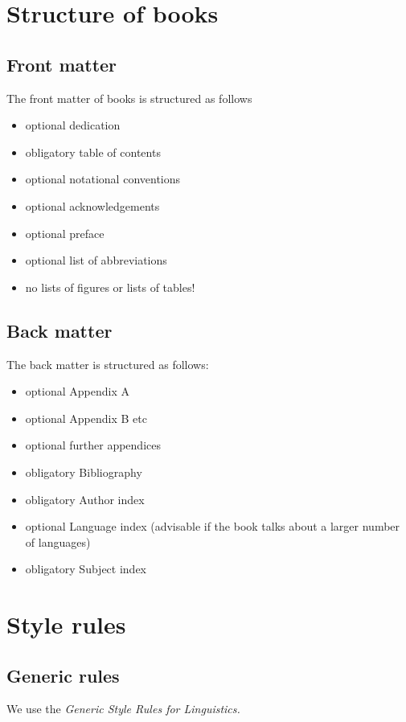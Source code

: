 \chapter{Structure of books}

\section{Front matter}

The front matter of \lsp books is structured as follows
\begin{itemize}
 \item optional dedication
 \item obligatory table of contents 
 \item optional notational conventions
 \item optional acknowledgements
 \item optional preface
 \item optional list of abbreviations
 \item no lists of figures or lists of tables!
\end{itemize}

\section{Back matter}
The back matter is structured as follows:

\begin{itemize}
 \item optional Appendix A
 \item optional Appendix B etc
 \item optional further appendices
 \item obligatory Bibliography
 \item obligatory Author index
 \item optional Language index (advisable if the book talks about a larger number of languages)
 \item obligatory Subject index
 
\end{itemize}


\chapter{Style rules}
\section{Generic rules}
We use the \em Generic Style Rules for Linguistics\em.

